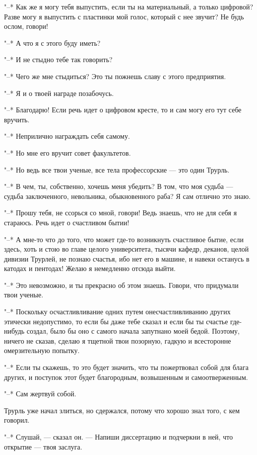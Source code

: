 "--* Как же я могу тебя выпустить, если ты на материальный,
а только цифровой? Разве могу я выпустить с пластинки мой
голос, который с нее звучит? Не будь ослом, говори!

"--* А что я с этого буду иметь?

"--* И не стыдно тебе так говорить?

"--* Чего же мне стыдиться? Это ты пожнешь славу с этого
предприятия.

"--* Я и о твоей награде позабочусь.

"--* Благодарю! Если речь идет о цифровом кресте, то и сам
могу его тут себе вручить.

"--* Неприлично награждать себя самому.

"--* Но мне его вручит совет факультетов.

"--* Но ведь все твои ученые, все тела профессорские --- это
один Трурль.

"--* В чем, ты, собственно, хочешь меня убедить? В том, что
моя судьба --- судьба заключенного, невольника, обыкновенного
раба? Я сам отлично это знаю.

"--* Прошу тебя, не ссорься со мной, говори! Ведь знаешь,
что не для себя я стараюсь. Речь идет о счастливом бытии!

"--* А мне-то что до того, что может где-то возникнуть
счастливое бытие, если здесь, хоть и стою во главе целого
университета, тысячи кафедр, деканов, целой дивизии Трурлей,
не познаю счастья, ибо нет его в машине, и навеки останусь в
катодах и пентодах! Желаю я немедленно отсюда выйти.

"--* Это невозможно, и ты прекрасно об этом знаешь. Говори,
что придумали твои ученые.

"--* Поскольку осчастливливание одних путем
онесчастливливанию других этически недопустимо, то если бы
даже тебе сказал и если бы ты счастье где-нибудь создал,
было бы оно с самого начала запутнано моей бедой. Поэтому,
ничего не сказав, сделаю я тщетной твои позорную, гадкую и
всесторонне омерзительную попытку.

"--* Если ты скажешь, то это будет значить, что ты
пожертвовал собой для блага других, и поступок этот будет
благородным, возвышенным и самоотверженным.

"--* Сам жертвуй собой.

Трурль уже начал злиться, но сдержался, потому что хорошо
знал того, с кем говорил.

"--* Слушай, --- сказал он. --- Напиши диссертацию и
подчеркни в ней, что открытие --- твоя заслуга.

